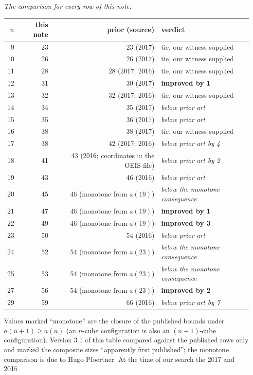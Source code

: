\documentclass[11pt,a4paper]{article}
\begin{document}
\emph{The comparison for every row of this note.}
\begin{center}
\begin{tabular}{rrrl}
\toprule
$n$ & this note & prior (source) & verdict\\
\midrule
 9 & 23 & 23 (2017) & tie, our witness supplied\\
10 & 26 & 26 (2017) & tie, our witness supplied\\
11 & 28 & 28 (2017; 2016) & tie, our witness supplied\\
12 & 31 & 30 (2017) & \textbf{improved by 1}\\
13 & 32 & 32 (2017; 2016) & tie, our witness supplied\\
14 & 34 & 35 (2017) & \emph{below prior art}\\
15 & 35 & 36 (2017) & \emph{below prior art}\\
16 & 38 & 38 (2017) & tie, our witness supplied\\
17 & 38 & 42 (2017; 2016) & \emph{below prior art by 4}\\
18 & 41 & 43 (2016; coordinates in the OEIS file) & \emph{below prior art by 2}\\
19 & 43 & 46 (2016) & \emph{below prior art}\\
20 & 45 & 46 (monotone from $a(19)$) & \emph{below the monotone consequence}\\
21 & 47 & 46 (monotone from $a(19)$) & \textbf{improved by 1}\\
22 & 49 & 46 (monotone from $a(19)$) & \textbf{improved by 3}\\
23 & 50 & 54 (2016) & \emph{below prior art}\\
24 & 52 & 54 (monotone from $a(23)$) & \emph{below the monotone consequence}\\
25 & 53 & 54 (monotone from $a(23)$) & \emph{below the monotone consequence}\\
27 & 56 & 54 (monotone from $a(23)$) & \textbf{improved by 2}\\
29 & 59 & 66 (2016) & \emph{below prior art by 7}\\
\bottomrule
\end{tabular}
\end{center}
Values marked ``monotone'' are the closure of the published bounds under $a(n+1)\ge a(n)$
(an $n$-cube configuration is also an $(n+1)$-cube configuration).  Version 3.1 of this table
compared against the published rows only and marked the composite sizes ``apparently first
published''; the monotone comparison is due to Hugo Pfoertner.  At the time of our search the 2017 and 2016
\end{document}
